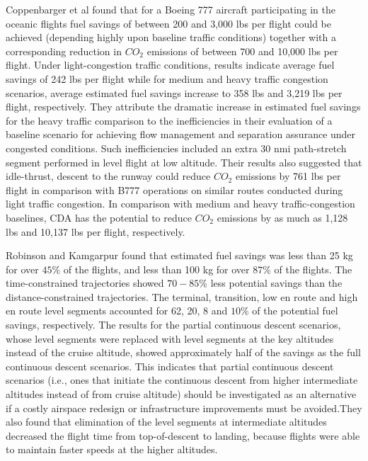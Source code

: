 \documentclass{aer1315-pretty}
\begin{document}
Coppenbarger et al \cite{Copp:2007} found that for a Boeing 777 aircraft participating in the oceanic flights fuel savings of between 200 and 3,000 lbs per flight could be achieved (depending highly upon baseline traffic conditions) together with a corresponding reduction in $CO_2$ emissions of between 700 and 10,000 lbs per flight. Under light-congestion traffic conditions, results indicate average fuel savings of 242 lbs per flight while for medium and heavy traffic congestion scenarios, average estimated fuel savings increase to 358 lbs and 3,219 lbs per flight, respectively. They attribute the dramatic increase in estimated fuel savings for the heavy traffic comparison to the inefficiencies in their evaluation of a baseline scenario for achieving flow management and separation assurance under congested conditions. Such inefficiencies included an extra 30 nmi path-stretch segment performed in level flight at low altitude. Their results also suggested that idle-thrust, descent to the runway could reduce $CO_2$ emissions by 761 lbs per flight in comparison with B777 operations on similar routes conducted during light traffic congestion. In comparison with medium and heavy traffic-congestion baselines, CDA has the potential to reduce $CO_2$ emissions by as much as 1,128 lbs and 10,137 lbs per flight, respectively. \par


Robinson and Kamgarpur \cite{Rob:2010} found that estimated fuel savings was less than 25 kg for over $45\%$ of the flights, and less than 100 kg for over $87\%$ of the flights. The time-constrained trajectories showed $70-85\%$ less potential savings than the distance-constrained trajectories.  The terminal, transition, low en route and high en route level segments accounted for 62, 20, 8 and $10\%$ of the potential fuel savings, respectively.  The results for the partial continuous descent scenarios, whose level segments were replaced with level segments at the key altitudes instead of the cruise altitude, showed approximately half of the savings as the full continuous descent scenarios. This indicates that partial continuous descent scenarios (i.e., ones that initiate the continuous descent from higher intermediate altitudes instead of from cruise altitude) should be investigated as an alternative if a costly airspace redesign or infrastructure improvements must be avoided.They also found that  elimination of the level segments at intermediate altitudes decreased the flight time from top-of-descent to landing, because flights were able to maintain faster speeds at the higher altitudes. \par
\end{document}

